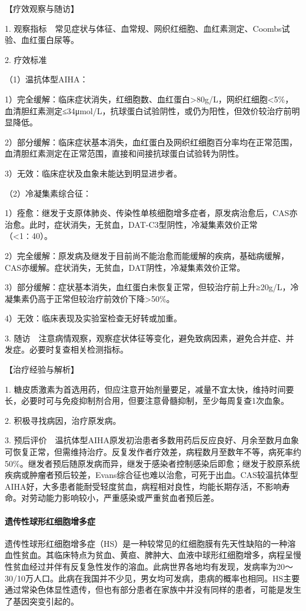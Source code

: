 【疗效观察与随访】

1.
观察指标　常见症状与体征、血常规、网织红细胞、血红素测定、Coombs试验、血红蛋白尿等。

2. 疗效标准

（1）温抗体型AIHA：

1）完全缓解：临床症状消失，红细胞数、血红蛋白\textgreater{}80g/L，网织红细胞<5\%，血清胆红素测定≤34μmol/L，抗球蛋白试验阴性，或仍为阳性，但效价较治疗前明显降低。

2）部分缓解：临床症状基本消失，血红蛋白及网织红细胞百分率均在正常范围，血清胆红素测定在正常范围，直接和间接抗球蛋白试验转为阴性。

3）无效：临床症状及血象未能达到明显进步者。

（2）冷凝集素综合征：

1）痊愈：继发于支原体肺炎、传染性单核细胞增多症者，原发病治愈后，CAS亦治愈。此时，症状消失，无贫血，DAT-C3型阴性，冷凝集素效价正常（<1∶40）。

2）完全缓解：原发病及继发于目前尚不能治愈而能缓解的疾病，基础病缓解，CAS亦缓解。症状消失，无贫血，DAT阴性，冷凝集素效价正常。

3）部分缓解：症状基本消失，血红蛋白未恢复正常，但较治疗前上升≥20g/L，冷凝集素仍高于正常但较治疗前效价下降\textgreater{}50\%。

4）无效：临床表现及实验室检查无好转或加重。

3.
随访　注意病情观察，观察症状体征等变化，避免致病因素，避免合并症、并发症。必要时复查相关检测指标。

【治疗经验与解析】

1.
糖皮质激素为首选用药，但应注意开始剂量要足，减量不宜太快，维持时间要长，必要时可与免疫抑制剂合用，但要注意骨髓抑制，至少每周复查1次血象。

2. 积极寻找病因，治疗原发病。

3.
预后评价　温抗体型AIHA原发初治患者多数用药后反应良好、月余至数月血象可恢复正常，但需维持治疗。反复发作者疗效差，病程数月至数年不等，病死率约50\%。继发者预后随原发病而异，继发于感染者控制感染后即愈；继发于胶原系统疾病或肿瘤者预后较差，Evans综合征也难以治愈，可死于出血。CAS较温抗体型AIHA好，大多患者能耐受轻度贫血，病程相对良性，均能长期存活，不影响寿命。对劳动能力影响较小，严重感染或严重贫血者预后差。

\paragraph{遗传性球形红细胞增多症}

遗传性球形红细胞增多症（HS）是一种较常见的红细胞膜有先天性缺陷的一种溶血性贫血。其临床特点为贫血、黄疸、脾肿大、血液中球形红细胞增多，病程呈慢性贫血经过并伴有反复急性发作的溶血。此病世界各地均有发现，发病率为20～30/10万人口。此病在我国并不少见，男女均可发病，患病的概率也相同。HS主要通过常染色体显性遗传，但也有部分患者在家族中并没有同样的患者，可能是发生了基因突变引起的。

